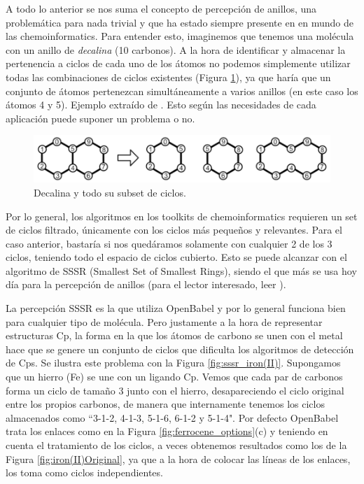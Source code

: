 A todo lo anterior se nos suma el concepto de percepción de anillos, una problemática para nada trivial y que ha estado siempre presente en en mundo de las chemoinformatics. Para entender esto, imaginemos que tenemos una molécula con un anillo de \textit{decalina} (10 carbonos). A la hora de identificar y almacenar la pertenencia a ciclos de cada uno de los átomos no podemos simplemente utilizar todas las combinaciones de ciclos existentes (Figura \ref{fig:decalina_all_ciclos}), ya que haría que un conjunto de átomos pertenezcan simultáneamente a varios anillos (en este caso los átomos 4 y 5). Ejemplo extraído de \cite{sssr_smallest_2020}. Esto según las necesidades de cada aplicación puede suponer un problema o no.

\begin{figure}[h!]
    \centering
    \includegraphics[scale=0.5]{imagenes/diseno/dibujo/decalina_all_cycles.png}
    \caption{Decalina y todo su subset de ciclos.}
    \label{fig:decalina_all_ciclos}
\end{figure}

Por lo general, los algoritmos en los toolkits de chemoinformatics requieren un set de ciclos filtrado, únicamente con los ciclos más pequeños y relevantes. Para el caso anterior, bastaría si nos quedáramos solamente con cualquier 2 de los 3 ciclos, teniendo todo el espacio de ciclos cubierto. Esto se puede alcanzar con el algoritmo de SSSR (Smallest Set of Smallest Rings), siendo el que más se usa hoy día para la percepción de anillos (para el lector interesado, leer \cite{sssr_smallest_2020, sssr_harmful,sssr_counterexamples_2004, sssr_review_1989}). 

La percepción SSSR es la que utiliza OpenBabel y por lo general funciona bien para cualquier tipo de molécula. Pero justamente a la hora de representar estructuras Cp, la forma en la que los átomos de carbono se unen con el metal hace que se genere un conjunto de ciclos que dificulta los algoritmos de detección de Cps. Se ilustra este problema con la Figura \ref{fig:sssr_iron(II)}. Supongamos que un hierro (Fe) se une con un ligando Cp. Vemos que cada par de carbonos forma un ciclo de tamaño 3 junto con el hierro, desapareciendo el ciclo original entre los propios carbonos, de manera que internamente tenemos los ciclos almacenados como ``3-1-2, 4-1-3, 5-1-6, 6-1-2 y 5-1-4". Por defecto OpenBabel trata los enlaces como en la Figura \ref{fig:ferrocene_options}(c) y teniendo en cuenta el tratamiento de los ciclos, a veces obtenemos resultados como los de la Figura \ref{fig:iron(II)Original}, ya que a la hora de colocar las líneas de los enlaces, los toma como ciclos independientes.

